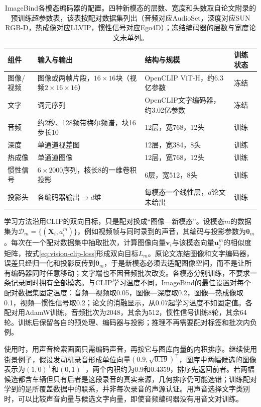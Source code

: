 \begin{table}[htbp]
  \centering
  \small
  \begin{tabularx}{\linewidth}{@{}p{14mm}XXp{12mm}@{}}
    \toprule
    组件 & 输入与输出 & 结构与规模 & 训练状态\\
    \midrule
    图像/视频 & 图像或两帧片段，$16\times16$块（视频$2\times16\times16$） & OpenCLIP ViT-H，约6.3亿参数 & 冻结\\
    文字 & 词元序列 & OpenCLIP文字编码器，约3.02亿参数 & 冻结\\
    音频 & 约2秒、128频带梅尔频谱，块16步长10 & 12层，宽768，12头 & 训练\\
    深度 & 单通道视差图 & 12层，宽384，8头 & 训练\\
    热成像 & 单通道图像 & 12层，宽768，12头 & 训练\\
    惯性信号 & $6\times2000$序列，核长8的一维卷积投影 & 6层，宽512，8头 & 训练\\
    投影头 & 各编码器输出$\to d$维 & 每模态一个线性层，$d$论文未给出 & 训练\\
    \bottomrule
  \end{tabularx}
  \caption{ImageBind各模态编码器的配置。四种新模态的层数、宽度和头数取自论文附录的预训练超参数表，该表按配对数据集列出（音频对应AudioSet，深度对应SUN RGB-D，热成像对应LLVIP，惯性信号对应Ego4D）；冻结编码器的层数与宽度论文未单列。}
  \label{tab:vision-models-imagebind-config}
\end{table}

学习方法沿用CLIP的双向目标，只是配对换成“图像—新模态”。设模态$m$的数据集为$\mathcal D_m=\{(\bm X_i,a_i^{m})\}$，例如视频帧与同时录到的声音，其编码与投影参数为$\bm\theta_m$。每次在一个配对数据集中抽取批次，计算图像向量$\bm v_i$与该模态向量$\bm u^{m}_j$的相似度矩阵，按式\eqref{eq:vision-clip-loss}形成双向目标$L_m$。原论文冻结图像和文字编码器，误差只经归一化和投影反传到$\bm\theta_m$，于是新模态必须去适配图像空间，而不是让所有编码器同时任意移动；文字端也不因音频批次改变。各模态分别训练，不要求一条记录同时拥有全部模态。与CLIP学习温度不同，ImageBind的最佳设置对每个配对数据集固定温度：音频—视频取0.05，图像—深度取0.2，图像—热成像取0.1，视频—惯性信号取0.2；论文的消融显示，从0.07起学习温度不如固定值。各配对用AdamW训练，音频批次为2048，其余为512，惯性信号训练8轮，其余64轮。训练后保留各自的预处理、编码器与投影；推理不再需要配对标签和批次内负例。

使用时，用声音检索画面只需编码声音，再按它与图库向量的内积排序。继续使用街景例子，假设发动机录音形成单位向量$(0.9,\sqrt{0.19})^\top$，图库中两幅候选的图像表示为$(1,0)^\top$和$(0,1)^\top$，两个内积约为0.9和0.4359，排序先返回前者。若两幅候选都含车辆但只有后者是这段录音的真实来源，几何排序仍可能选错；训练配对学到的是所覆盖数据中的联系，并非每次录音的声源认证。用声音选择文字类别时，可以比较声音向量与候选文字向量，即使音频编码器没有用音文对训练。

